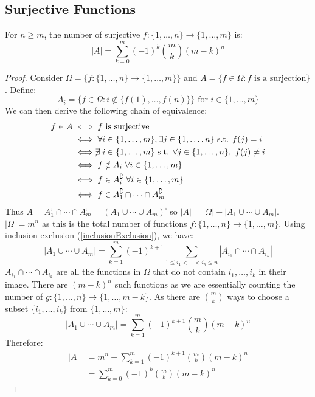 \documentclass[../main.tex]{subfiles}
\begin{document}
\subsection{Surjective Functions}
\begin{proposition}
  For $n \geq m$, the number of surjective $f: \{1, \ldots, n\} \to \{1, \ldots, m\}$ is:
  \[
    |A| = \sum_{k = 0}^{m} (-1)^{k} \binom{m}{k} (m - k)^{n}
  \]
\end{proposition}
\begin{proof}
  Consider $\Omega = \{f: \{1, \ldots, n\} \to \{1, \ldots, m\}\}$ and $A = \{f \in \Omega: f \text{ is a surjection}\}$.
  Define:
  \[
    A_i = \{f \in \Omega: i \notin \{f(1), \ldots, f(n)\}\} \text{ for } i \in \{1, \ldots, m\}
  \]
  We can then derive the following chain of equivalence:
  \begin{align*}
    f \in A &\iff f \text{ is surjective} \\
            &\iff \forall i \in \{1, \ldots, m\}, \exists j \in \{1, \ldots, n\} \text{ s.t. } f(j) = i \\
            &\iff \centernot\exists i \in \{1, \ldots, m\} \text{ s.t. } \forall j \in \{1, \ldots, n\},\ f(j) \neq i \\
            &\iff f \notin A_i\ \forall i \in \{1, \ldots, m\} \\
            &\iff f \in A^{\comp}_i\ \forall i \in \{1, \ldots, m\} \\
            &\iff f \in A^{\comp}_1 \cap \cdots \cap A^{\comp}_m
  \end{align*}
  Thus $A = A^{\comp}_1 \cap \cdots \cap A^{\comp}_m = (A_1 \cup \cdots \cup A_m)^{\comp}$ so $|A| = |\Omega| - |A_1 \cup \cdots \cup A_m|$.
  $|\Omega| = m^{n}$ as this is the total number of functions $f: \{1, \ldots, n\} \to \{1, \ldots, m\}$.
  Using inclusion exclusion (\cref{inclusionExclusion}), we have:
  \[
    |A_1 \cup \cdots \cup A_m| = \sum_{k = 1}^{m} (-1)^{k + 1} \sum_{1 \leq i_1 < \cdots < i_k \leq n} |A_{i_1} \cap \cdots \cap A_{i_k}|
  \]
  $A_{i_1} \cap \cdots \cap A_{i_k}$ are all the functions in $\Omega$ that do not contain $i_1, \ldots, i_k$ in their image.
  There are $(m - k)^{n}$ such functions as we are essentially counting the number of $g: \{1, \ldots, n\} \to \{1, \ldots, m - k\}$.
  As there are $\binom{m}{k}$ ways to choose a subset $\{i_1, \ldots, i_k\}$ from $\{1, \ldots, m\}$:
  \[
    |A_1 \cup \cdots \cup A_m| = \sum_{k = 1}^{m} (-1)^{k + 1} \binom{m}{k}(m - k)^{n}
  \]
  Therefore:
  \begin{align*}
    |A| &= m^{n} - \sum_{k = 1}^{m} (-1)^{k + 1} \binom{m}{k}(m - k)^{n} \\
        &= \sum_{k = 0}^{m} (-1)^{k} \binom{m}{k} (m - k)^{n}
  \end{align*}
\end{proof}
\end{document}
